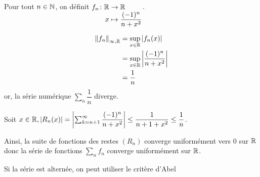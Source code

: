 \documentclass[a4paper,12pt]{article}
\begin{document}
\begin{exemple}
    Pour tout $n \in \mathbb{N}$, on définit $\funcdef{f_n}{\R}{\R}{x}{\dfrac{(-1)^n}{n + x^2}}$.

    \begin{align*}
        \left\lVert f_n\right\rVert_{\infty, \mathbb{R}} &= \sup_{x \in \mathbb{R}}|f_n(x)| \\
        &= \sup_{x \in \mathbb{R}} \left| \dfrac{(-1)^n}{n + x^2} \right| \\
        &= \dfrac{1}{n}
    \end{align*}
    or, la série numérique $\sum_n \dfrac{1}{n}$ diverge.

    Soit $x \in \mathbb{R}, |R_n(x)| = \left| \sum_{k=n+1}^\infty \dfrac{(-1)^n}{n + x^2} \right| \leq \dfrac{1}{n + 1 + x^2} \leq \dfrac{1}{n}$.

    Ainsi, la suite de fonctions des restes $(R_n)$ converge uniformément vers $0$ sur $\mathbb{R}$ donc la série de fonctions $\sum\limits_n f_n$ converge uniformément sur $\mathbb{R}$.
\end{exemple}

\begin{methode}
    Si la série est alternée, on peut utiliser le critère d'Abel
\end{methode}
\end{document}

